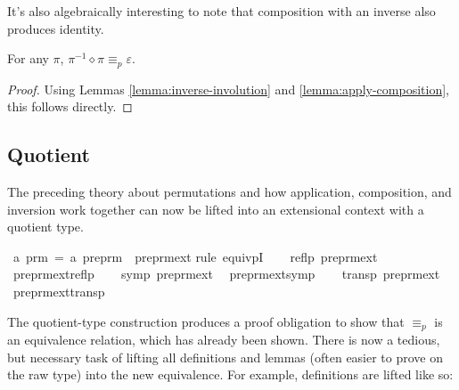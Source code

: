 It's also algebraically interesting to note that composition with an inverse also produces identity.
\begin{lemma}
\label{lemma:group-inverse}
For any \(\pi\), \(\pi^{-1} \diamond \pi \equiv_p \varepsilon\).
\end{lemma}
\begin{proof}
Using Lemmas \ref{lemma:inverse-involution} and \ref{lemma:apply-composition}, this follows directly.
\end{proof}

\subsection{Quotient}
The preceding theory about permutations and how application, composition, and inversion work together can now be lifted into an extensional context with a quotient type.

\begin{implementation}
\isamarkupfalse%
\ {\isacharprime}a\ prm\ =\ {\isachardoublequoteopen}{\isacharprime}a\ preprm{\isachardoublequoteclose}\ {\isacharslash}\ preprm{\isacharunderscore}ext\isanewline
%
\isatagproof
{}\isamarkupfalse%
{\isacharparenleft}rule\ equivpI{\isacharparenright}\isanewline
\ \ \isamarkupfalse%
\ {\isachardoublequoteopen}reflp\ preprm{\isacharunderscore}ext{\isachardoublequoteclose}\ \isamarkupfalse%
\ preprm{\isacharunderscore}ext{\isacharunderscore}reflp\isacommand{{\isachardot}}\isamarkupfalse%
\isanewline
\ \ \isamarkupfalse%
\ {\isachardoublequoteopen}symp\ preprm{\isacharunderscore}ext{\isachardoublequoteclose}\ \isamarkupfalse%
\ preprm{\isacharunderscore}ext{\isacharunderscore}symp\isacommand{{\isachardot}}\isamarkupfalse%
\isanewline
\ \ \isamarkupfalse%
\ {\isachardoublequoteopen}transp\ preprm{\isacharunderscore}ext{\isachardoublequoteclose}\ \isamarkupfalse%
\ preprm{\isacharunderscore}ext{\isacharunderscore}transp\isacommand{{\isachardot}}\isamarkupfalse%
\isanewline
{}\isamarkupfalse%
\endisatagproof
\end{implementation}

The quotient-type construction produces a proof obligation to show that \(\equiv_p\) is an equivalence relation, which has already been shown.
There is now a tedious, but necessary task of lifting all definitions and lemmas (often easier to prove on the raw type) into the new equivalence.
For example, definitions are lifted like so:

